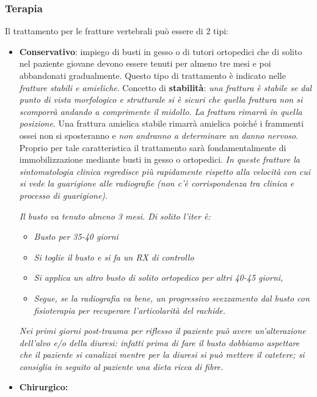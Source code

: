 \subsubsection{Terapia}

Il trattamento per le fratture vertebrali può essere di 2 tipi:

\begin{itemize}
\item
  \textbf{Conservativo}: impiego di busti in gesso o di tutori ortopedici che di solito nel paziente giovane devono essere tenuti per almeno tre mesi e poi abbandonati gradualmente. Questo tipo di trattamento è indicato nelle \emph{fratture stabili e amieliche}. Concetto di \textbf{stabilità}: \emph{una frattura è stabile se dal punto di vista morfologico e strutturale si è sicuri che quella frattura non si scomporrà andando a comprimente il midollo. La frattura rimarrà in quella posizione}. Una frattura amielica stabile rimarrà amielica poiché i frammenti ossei non si sposteranno e \emph{non andranno a determinare un danno nervoso}. Proprio per tale caratteristica il trattamento sarà fondamentalmente di immobilizzazione mediante busti in gesso o ortopedici. \emph{In queste fratture la sintomatologia clinica regredisce più rapidamente rispetto alla velocità con cui si vede la guarigione alle radiografie (non c'è corrispondenza tra clinica e processo di guarigione).}

\emph{Il busto va tenuto almeno 3 mesi. Di solito l'iter è:}

\begin{itemize}
\item
  \emph{Busto per 35-40 giorni}
\item
  \emph{Si toglie il busto e si fa un RX di controllo}
\item
  \emph{Si applica un altro busto di solito ortopedico per altri 40-45 giorni,}
\item
  \emph{Segue, se la radiografia va bene, un progressivo svezzamento dal busto con fisioterapia per recuperare l'articolarità del rachide.}
\end{itemize}

\emph{Nei primi giorni post-trauma per riflesso il paziente può avere un'alterazione dell'alvo e/o della diuresi: infatti prima di fare il busto dobbiamo aspettare che il paziente si canalizzi mentre per la diuresi si può mettere il catetere; si consiglia in seguito al paziente una dieta ricca di fibre.}

\item
  \textbf{Chirurgico:}


\end{itemize}
